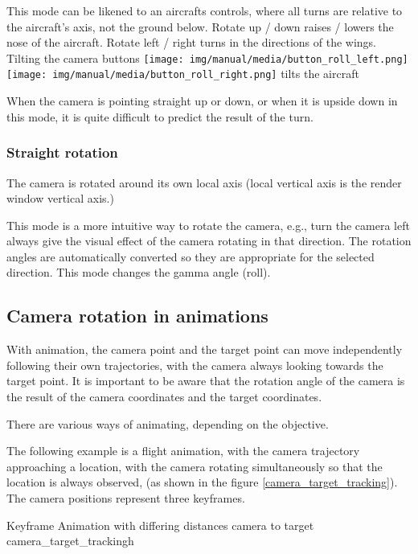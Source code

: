 This mode can be likened to an aircrafts controls, where all turns are relative
to the aircraft's axis, not the ground below. Rotate up / down raises / lowers
the nose of the aircraft. Rotate left / right turns in the directions of the
wings. Tilting the camera buttons
\texttt{[image: img/manual/media/button\_roll\_left.png]}\texttt{[image: img/manual/media/button\_roll\_right.png]}
tilts the aircraft

When the camera is pointing straight up or down, or when it is upside down in
this mode, it is quite difficult to predict the result of the turn.

\subsubsection{Straight rotation}\label{straight-rotation}

The camera is rotated around its own local axis (local vertical axis is the
render window vertical axis.)

This mode is a more intuitive way to rotate the camera, e.g., turn the camera
left always give the visual effect of the camera rotating in that direction. The
rotation angles are automatically converted so they are appropriate for the
selected direction. This mode changes the gamma angle (roll).

\subsection{Camera rotation in animations}\label{camera-rotation-in-animations}

With animation, the camera point and the target point can move independently
following their own trajectories, with the camera always looking towards the
target point. It is important to be aware that the rotation angle of the camera
is the result of the camera coordinates and the target coordinates.

There are various ways of animating, depending on the objective.

The following example is a flight animation, with the camera trajectory
approaching a location, with the camera rotating simultaneously so that the
location is always observed, (as shown in the figure \ref{camera_target_tracking}). The camera
positions represent three keyframes.

{Keyframe Animation with differing distances camera to target}
{camera_target_tracking}{h}

